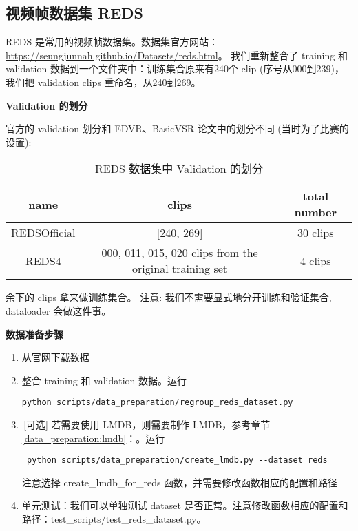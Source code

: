 \documentclass[../main.tex]{subfiles}
\begin{document}
\subsection{视频帧数据集 REDS}

REDS 是常用的视频帧数据集。数据集官方网站：\url{https://seungjunnah.github.io/Datasets/reds.html}。
我们重新整合了 training 和 validation 数据到一个文件夹中：训练集合原来有240个 clip (序号从000到239)，我们把 validation clips 重命名，从240到269。

\noindent\textbf{Validation 的划分}

官方的 validation 划分和 EDVR、BasicVSR 论文中的划分不同 (当时为了比赛的设置):

\begin{table}[h]
    \centering
    \begin{tabular}{|c|c|c|}
        \hline
        \textbf{name} & \textbf{clips}                                          & \textbf{total number} \\ \hline
        REDSOfficial  & [240, 269]                                              & 30 clips              \\ \hline
        REDS4         & 000, 011, 015, 020 clips from the original training set & 4 clips               \\ \hline
    \end{tabular}
    \caption{REDS 数据集中 Validation 的划分}
\end{table}
余下的 clips 拿来做训练集合。 注意: 我们不需要显式地分开训练和验证集合, dataloader 会做这件事。

\noindent\textbf{数据准备步骤}

\begin{enumerate}
    \item 从\href{https://seungjunnah.github.io/Datasets/reds.html}{官网}下载数据
    \item 整合 training 和 validation 数据。运行
    \begin{verbatim}
python scripts/data_preparation/regroup_reds_dataset.py
\end{verbatim}
    \item\,[可选] 若需要使用 LMDB，则需要制作 LMDB，参考章节 \ref{data_preparation:lmdb}：。运行
    \begin{verbatim}
 python scripts/data_preparation/create_lmdb.py --dataset reds
\end{verbatim}
    注意选择 create\_lmdb\_for\_reds 函数，并需要修改函数相应的配置和路径
    \item 单元测试：我们可以单独测试 dataset 是否正常。注意修改函数相应的配置和路径：test\_scripts/test\_reds\_dataset.py。
\end{enumerate}
\end{document}
